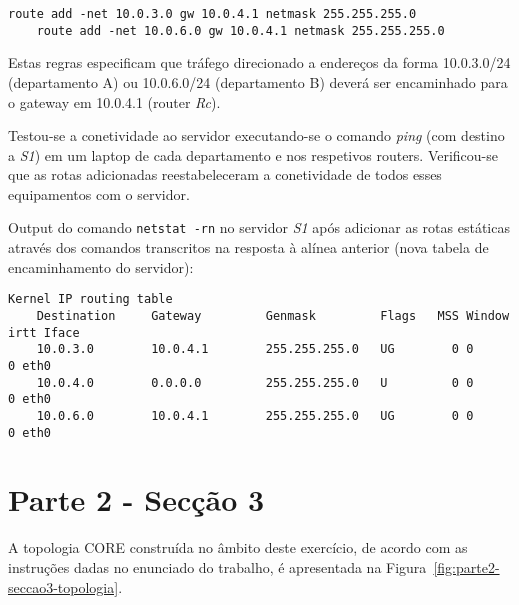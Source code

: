 \begin{Verbatim}[fontsize=\scriptsize]
    route add -net 10.0.3.0 gw 10.0.4.1 netmask 255.255.255.0
    route add -net 10.0.6.0 gw 10.0.4.1 netmask 255.255.255.0
\end{Verbatim}

Estas regras especificam que tráfego direcionado a endereços da forma
10.0.3.0/24 (departamento A) ou 10.0.6.0/24 (departamento B) deverá ser
encaminhado para o gateway em 10.0.4.1 (router \emph{Rc}).


Testou-se a conetividade ao servidor executando-se o comando \emph{ping} (com
destino a \emph{S1}) em um laptop de cada departamento e nos respetivos routers.
Verificou-se que as rotas adicionadas reestabeleceram a conetividade de todos
esses equipamentos com o servidor.

Output do comando \texttt{netstat -rn} no servidor \emph{S1} após adicionar as
rotas estáticas através dos comandos transcritos na resposta à alínea anterior
(nova tabela de encaminhamento do servidor):

\begin{Verbatim}[fontsize=\scriptsize]
    Kernel IP routing table
    Destination     Gateway         Genmask         Flags   MSS Window  irtt Iface
    10.0.3.0        10.0.4.1        255.255.255.0   UG        0 0          0 eth0
    10.0.4.0        0.0.0.0         255.255.255.0   U         0 0          0 eth0
    10.0.6.0        10.0.4.1        255.255.255.0   UG        0 0          0 eth0
\end{Verbatim}


\section*{Parte 2 - Secção 3}


A topologia CORE construída no âmbito deste exercício, de acordo com as
instruções dadas no enunciado do trabalho, é apresentada na
Figura~\ref{fig:parte2-seccao3-topologia}.


